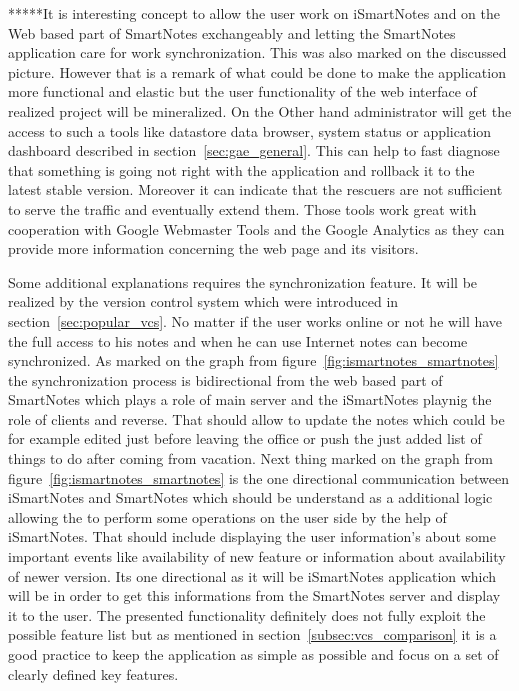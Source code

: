 *****It is interesting concept to allow the user work on iSmartNotes and on the Web based part of SmartNotes exchangeably  and letting the SmartNotes application care for work synchronization. This was also marked on the discussed picture. However that is a remark of what could be done to make the application more functional and elastic but the user functionality of the web interface of realized project will be mineralized. On the Other hand administrator will get the access to such a tools like datastore data browser, system status or application dashboard described in section~\ref{sec:gae_general}. This can help to fast diagnose that something is going not right with the application and rollback it to the latest stable version. Moreover  it can indicate that the rescuers are not sufficient to serve the traffic and eventually extend them. Those tools work great with cooperation with Google Webmaster Tools and the Google Analytics as they can provide more information concerning the web page and its visitors.

Some additional explanations requires the synchronization feature. It will be realized by the version control system which were introduced in section~\ref{sec:popular_vcs}. No matter if the user works online or not he will have the full access to his notes and when he can use Internet notes can become synchronized. As marked on the graph from figure~\ref{fig:ismartnotes_smartnotes} the synchronization process is bidirectional from the web based part of SmartNotes which plays a role of main server and the iSmartNotes playnig the role of clients and reverse. That should allow to update the notes which could be for example edited just before leaving the office or push the just added list of things to do after coming from vacation. Next thing marked on the graph from figure~\ref{fig:ismartnotes_smartnotes} is the one directional communication between iSmartNotes and SmartNotes which should be understand as a additional logic allowing the to perform some operations on the user side by the help of iSmartNotes. That should include displaying the user information's about some important events like availability of new feature or information about availability of newer version.  Its one directional as it will be iSmartNotes application which will be in order to get this informations from the SmartNotes server and display it to the user. The presented functionality definitely does not fully exploit the possible feature list but as mentioned in section~\ref{subsec:vcs_comparison} it is a good practice to keep the application as simple as possible and focus on a set of clearly defined key features.
